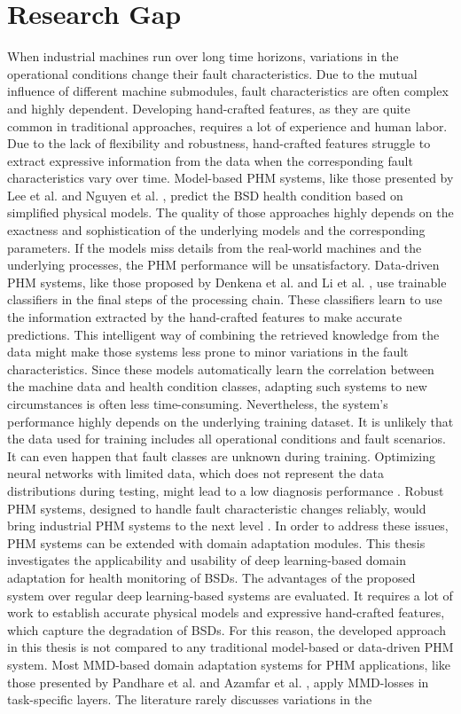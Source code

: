\section{Research Gap}
When industrial machines run over long time horizons, variations in the operational conditions change their fault characteristics. Due to the mutual influence of different machine submodules, fault characteristics are often complex and highly dependent. Developing hand-crafted features, as they are quite common in traditional approaches, requires a lot of experience and human labor. Due to the lack of flexibility and robustness, hand-crafted features struggle to extract expressive information from the data when the corresponding fault characteristics vary over time. Model-based PHM systems, like those presented by Lee et al. \cite{Lee2015} and Nguyen et al. \cite{NGUYEN2019},  predict the BSD health condition based on simplified physical models. The quality of those approaches highly depends on the exactness and sophistication of the underlying models and the corresponding parameters. If the models miss details from the real-world machines and the underlying processes, the PHM performance will be unsatisfactory. Data-driven PHM systems, like those proposed by Denkena et al. \cite{Denkena2021} and Li et al. \cite{LiPin2018}, use trainable classifiers in the final steps of the processing chain. These classifiers learn to use the information extracted by the hand-crafted features to make accurate predictions. This intelligent way of combining the retrieved knowledge from the data might make those systems less prone to minor variations in the fault characteristics. Since these models automatically learn the correlation between the machine data and health condition classes, adapting such systems to new circumstances is often less time-consuming. Nevertheless, the system's performance highly depends on the underlying training dataset. It is unlikely that the data used for training includes all operational conditions and fault scenarios. It can even happen that fault classes are unknown during training. Optimizing neural networks with limited data, which does not represent the data distributions during testing, might lead to a low diagnosis performance \cite{AZAMFAR2020103932}. Robust PHM systems, designed to handle fault characteristic changes reliably, would bring industrial PHM systems to the next level \cite{Michau2017}. In order to address these issues, PHM systems can be extended with domain adaptation modules. This thesis investigates the applicability and usability of deep learning-based domain adaptation for health monitoring of BSDs. The advantages of the proposed system over regular deep learning-based systems are evaluated. It requires a lot of work to establish accurate physical models and expressive hand-crafted features, which capture the degradation of BSDs. For this reason, the developed approach in this thesis is not compared to any traditional model-based or data-driven PHM system. Most MMD-based domain adaptation systems for PHM applications, like those presented by Pandhare et al. \cite{Pandhare2021} and Azamfar et al. \cite{AZAMFAR2020103932}, apply MMD-losses in task-specific layers. The literature rarely discusses variations in the 
